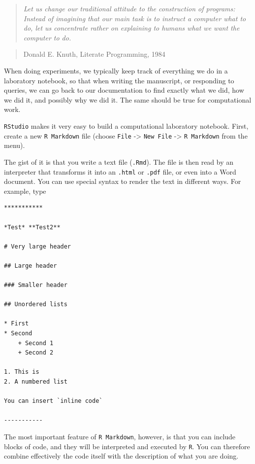 \documentclass[
  letterpaper,
  DIV=11,
  numbers=noendperiod]{scrreprt}
\begin{document}

\begin{quote}
\emph{Let us change our traditional attitude to the construction of
programs: Instead of imagining that our main task is to instruct a
computer what to do, let us concentrate rather on explaining to humans
what we want the computer to do.}
\end{quote}

\begin{quote}
Donald E. Knuth, Literate Programming, 1984
\end{quote}

When doing experiments, we typically keep track of everything we do in a
laboratory notebook, so that when writing the manuscript, or responding
to queries, we can go back to our documentation to find exactly what we
did, how we did it, and possibly why we did it. The same should be true
for computational work.

\texttt{RStudio} makes it very easy to build a computational laboratory
notebook. First, create a new \texttt{R\ Markdown} file (choose
\texttt{File} -\textgreater{} \texttt{New\ File} -\textgreater{}
\texttt{R\ Markdown} from the menu).

The gist of it is that you write a text file (\texttt{.Rmd}). The file
is then read by an interpreter that transforms it into an \texttt{.html}
or \texttt{.pdf} file, or even into a Word document. You can use special
syntax to render the text in different ways. For example, type

\begin{verbatim}
***********

*Test* **Test2**

# Very large header

## Large header

### Smaller header

## Unordered lists

* First
* Second
    + Second 1
    + Second 2

1. This is
2. A numbered list

You can insert `inline code`

-----------
\end{verbatim}

The most important feature of \texttt{R\ Markdown}, however, is that you
can include blocks of code, and they will be interpreted and executed by
\texttt{R}. You can therefore combine effectively the code itself with
the description of what you are doing.
\end{document}
